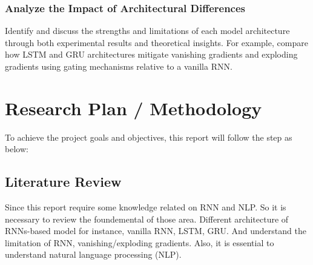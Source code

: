 \documentclass[12pt,a4paper]{article}
\begin{document}
\subsubsection{Analyze the Impact of Architectural Differences}
Identify and discuss the strengths and limitations of each model architecture through both experimental results and theoretical insights. For example, compare how LSTM and GRU architectures mitigate vanishing gradients and exploding gradients using gating mechanisms relative to a vanilla RNN.



\section{Research Plan / Methodology}
To achieve the project goals and objectives, this report will follow the step as below:
\subsection{Literature Review}
Since this report require some knowledge related on RNN and NLP. So it is necessary to review the foundemental of those area. Different architecture of RNNs-based model for instance, vanilla RNN, LSTM, GRU. And understand the limitation of RNN, vanishing/exploding gradients. Also, it is essential to understand natural language processing (NLP).  
\end{document}

